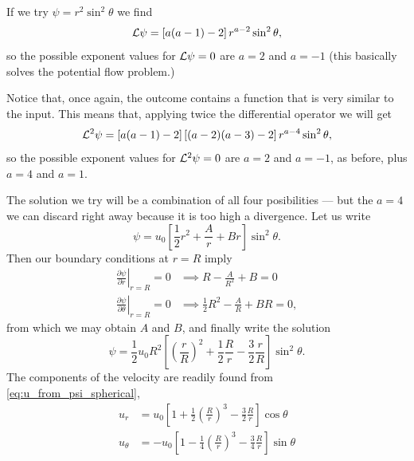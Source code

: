 
If we try $\psi=r^2 \sin^2\theta$ we find
\[
  {\cal L} \psi = \left[ a(a-1) - 2 \right] r^{a-2} \sin^2\theta ,
\]
so the possible exponent values for ${\cal L} \psi = 0$ are $a=2$ and
$a=-1$ (this basically solves the potential flow problem.)

Notice that, once again, the outcome contains a function that is very
similar to the input. This means that, applying twice the differential
operator we will get
\[
  {\cal L}^2 \psi =
  \left[   a  (a-1) - 2 \right]
  \left[ (a-2)(a-3) - 2 \right]
  r^{a-4} \sin^2\theta ,
\]
so  the possible exponent values for ${\cal L}^2 \psi = 0$ are $a=2$ and
$a=-1$, as before, plus $a=4$ and $a=1$.

The solution we try will be a combination of all four posibilities --- but
the $a=4$ we can discard right away because it is too high a divergence. Let
us write
\[
  \psi = u_0 \left[ \frac12 r^2 + \frac{A}{r} + B r \right] \sin^2\theta .
\]
Then our boundary conditions at $r=R$ imply
\begin{align*}
  \left.\frac{\partial \psi}{\partial r}\right|_{r=R} = 0 &\implies
                                                            R-\frac{A}{R^2} + B  =0 \\
  \left.\frac{\partial \psi}{\partial \theta}\right|_{r=R} = 0 &\implies
                                                            \frac12 R^2-\frac{A}{R} + BR  =0 ,
\end{align*}
from which we may obtain $A$ and $B$, and finally write the solution
\[
  \psi = \frac12 u_0 R^2
  \left[\left(  \frac{r}{R} \right)^2
    + \frac12 \frac{R}{r} - \frac32 \frac{r}{R} \right] \sin^2\theta .
\]
The components of the velocity are readily found from
\ref{eq:u_from_psi_spherical},
\begin{equation*}
  \begin{split}
    u_r     &=  u_0  \left[
      1+ \frac12 \left(\frac{R}{r}\right)^3 - \frac32 \frac{R}{r}
    \right] \cos \theta \\
    u_\theta &=
    - u_0  \left[
      1
      - \frac14 \left(\frac{R}{r}\right)^3 - \frac34 \frac{R}{r}
    \right] \sin \theta
  \end{split}
\end{equation*}

